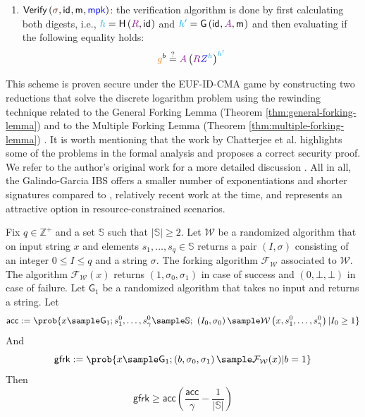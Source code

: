 \documentclass[version=submission, floatrow]{iacrcc}
\begin{document}
\begin{definition}
\begin{enumerate}[label={\emph{\roman*}})]
    \item $\mathsf{Verify}\left(\Signature{}, \id{}, \msg{}, \mpk\right)$: the verification algorithm is done by first calculating both digests, i.e., $\Digest{h} = \HashH{\Commitment{R}, \id{}}$ and $\Digest{h'} = \HashG{\id{}, \Commitment{A}, \msg{}}$ and then evaluating if the following equality holds:\[ 
      \GeneratorSchnorr^{b} \overset{?}{=} \Commitment{A}\left(\Commitment{R}\PubKey{Z}^{\Digest{h}}\right)^{\Digest{h'}}
      \] 
  \end{enumerate}
\end{definition}

This scheme is proven secure under the EUF-ID-CMA game by constructing two reductions that solve the discrete logarithm problem using the rewinding technique related to the General Forking Lemma (Theorem \ref{thm:general-forking-lemma}) \cite{CCS:BelNev06} and to the Multiple Forking Lemma (Theorem \ref{thm:multiple-forking-lemma}) \cite{Boldyreva2012}. It is worth mentioning that the work by Chatterjee et al. highlights some of the problems in the formal analysis and proposes a correct security proof. We refer to the author's original work for a more detailed discussion \cite{Chatterjee2012}. All in all, the Galindo-Garcia IBS offers a smaller number of exponentiations and shorter signatures compared to \cite{Herranz2006, Barreto2005}, relatively recent work at the time, and represents an attractive option in resource-constrained scenarios.

\begin{theorem}\label{thm:general-forking-lemma}
    Fix $q \in \mathbb{Z}^{+}$ and a set $\mathbb{S}$ such that $|\mathbb{S}| \ge 2$. Let $\mathcal{W}$ be a randomized algorithm that on input string $x$ and elements $s_{1},\ldots,s_{q} \in \mathbb{S}$ returns a pair $\left(I,\sigma\right)$ consisting of an integer $0 \le I \le q$ and a string $\sigma$. The forking algorithm $\mathcal{F}_{\mathcal{W}}$ associated to $\mathcal{W}$. The algorithm $\mathcal{F}_{\mathcal{W}}\left(x\right)$ returns $\left(1,\sigma_{0},\sigma_{1}\right)$ in case of success and $\left(0,\bot,\bot\right)$ in case of failure. Let $\mathsf{G}_{1}$ be a randomized algorithm that takes no input and returns a string. Let\[
        \mathsf{acc} := \prob{x\sample \mathsf{G}_{1}; s_{1}^{0},\ldots,s_{\gamma}^{0} \sample \mathbb{S};\ \left(I_{0},\sigma_{0}\right) \sample \mathcal{W}\left(x, s_{1}^{0},\ldots,s_{\gamma}^{0}\right) | I_{0} \ge 1}
    \]
    And\[
        \mathsf{gfrk} := \prob{x \sample \mathsf{G}_{1}; \left(b, \sigma_{0}, \sigma_{1}\right) \sample \mathcal{F}_{\mathcal{W}}(x)| b = 1}
    \]
    Then\[
        \mathsf{gfrk} \ge \mathsf{acc}\left(\dfrac{\mathsf{acc}}{\gamma} - \dfrac{1}{|\mathbb{S}|}\right)
    \]
\end{theorem}
\end{document}
